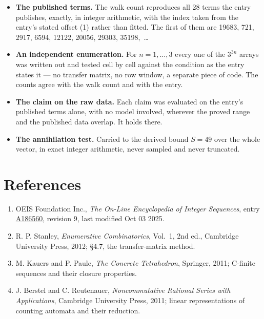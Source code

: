 \documentclass[11pt]{article}
\theoremstyle{definition}
\begin{document}
\begin{itemize}

\item {\bfseries The published terms.} The walk count reproduces all 28 terms the entry publishes, exactly, in integer arithmetic, with the index taken from the entry's stated offset (1) rather than fitted. The first of them are 19683, 721, 2917, 6594, 12122, 20056, 29303, 35198,~\dots

\item {\bfseries An independent enumeration.} For $n = 1,\dots,3$ every one of the $3^{3n}$ arrays was written out and tested cell by cell against the condition as the entry states it --- no transfer matrix, no row window, a separate piece of code. The counts agree with the walk count and with the entry.

\item {\bfseries The claim on the raw data.} Each claim was evaluated on the entry's published terms alone, with no model involved, wherever the proved range and the published data overlap. It holds there.

\item {\bfseries The annihilation test.} Carried to the derived bound $S = 49$ over the whole vector, in exact integer arithmetic, never sampled and never truncated.

\end{itemize}

\section{References}

\begin{enumerate}

\item OEIS Foundation Inc., \emph{The On-Line Encyclopedia of Integer Sequences}, entry \href{https://oeis.org/A186560}{A186560}, revision 9, last modified Oct 03 2025.

\item R. P. Stanley, \emph{Enumerative Combinatorics}, Vol.~1, 2nd ed., Cambridge University Press, 2012; \S4.7, the transfer-matrix method.

\item M. Kauers and P. Paule, \emph{The Concrete Tetrahedron}, Springer, 2011; C-finite sequences and their closure properties.

\item J. Berstel and C. Reutenauer, \emph{Noncommutative Rational Series with Applications}, Cambridge University Press, 2011; linear representations of counting automata and their reduction.

\end{enumerate}
\end{document}
